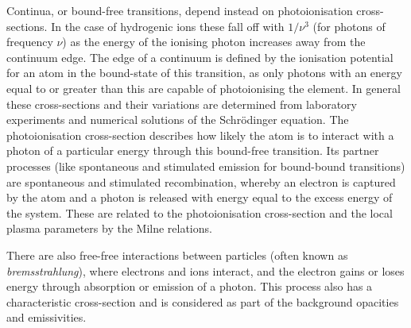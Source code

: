 Continua, or bound-free transitions, depend instead on photoionisation cross-sections.
In the case of hydrogenic ions these fall off with $1/\nu^3$ (for photons of frequency $\nu$) as the energy of the ionising photon increases away from the continuum edge.
The edge of a continuum is defined by the ionisation potential for an atom in the bound-state of this transition, as only photons with an energy equal to or greater than this are capable of photoionising the element.
In general these cross-sections and their variations are determined from laboratory experiments and numerical solutions of the Schr\"{o}dinger equation.
The photoionisation cross-section describes how likely the atom is to interact with a photon of a particular energy through this bound-free transition.
Its partner processes (like spontaneous and stimulated emission for bound-bound transitions) are spontaneous and stimulated recombination, whereby an electron is captured by the atom and a photon is released with energy equal to the excess energy of the system.
These are related to the photoionisation cross-section and the local plasma parameters by the Milne relations.

There are also free-free interactions between particles (often known as \emph{bremsstrahlung}), where electrons and ions interact, and the electron gains or loses energy through absorption or emission of a photon.
This process also has a characteristic cross-section and is considered as part of the background opacities and emissivities.

